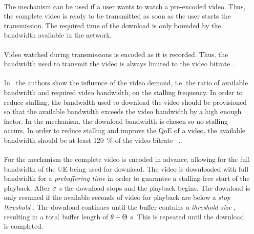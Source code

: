 \paragraph*{\download} The \emph{\download} mechanism can be used if a user wants to watch a pre-encoded video.
Thus, the complete video is ready to be transmitted as soon as the user starts the transmission.
The required time of the download is only bounded by the bandwidth available in the network.

\paragraph*{\live} Video watched during \emph{\live} transmissions is encoded as it is recorded.
Thus, the bandwidth used to transmit the video is always limited to the video bitrate \bitrate.

\paragraph*{\serviceprovisioning} In~\cite{Hossfeld2011a} the authors show the influence of the video demand, i.e. the ratio of available bandwidth and required video bandwidth, on the stalling frequency.
In order to reduce stalling, the bandwidth used to download the video should be provisioned so that the available bandwidth exceeds the video bandwidth by a high enough factor.
In the \emph{\serviceprovisioning} mechanism, the download bandwidth is chosen so no stalling occurs.
In order to reduce stalling and improve the \gls{QoE} of a video, the available bandwidth should be at least \SI{120}{\percent} of the video bitrate \bitrate~\cite{Hossfeld13a}.

\paragraph*{\streaming} For the \emph{\streaming} mechanism the complete video is encoded in advance, allowing for the full bandwidth of the \gls{UE} being used for download.
The video is downloaded with full bandwidth for a \emph{prebuffering time} \streamingstart in order to guarantee a stalling-free start of the playback.
After \(\sigma\) \si{\second} the download stops and the playback begins.
The download is only resumed if the available seconds of video for playback are below a \emph{stop threshold} \bufferlower.
The download continues until the buffer contains a \emph{threshold size} \buffersize, resulting in a total buffer length of \(\theta + \Theta\) \si{\second}.
This is repeated until the download is completed.

